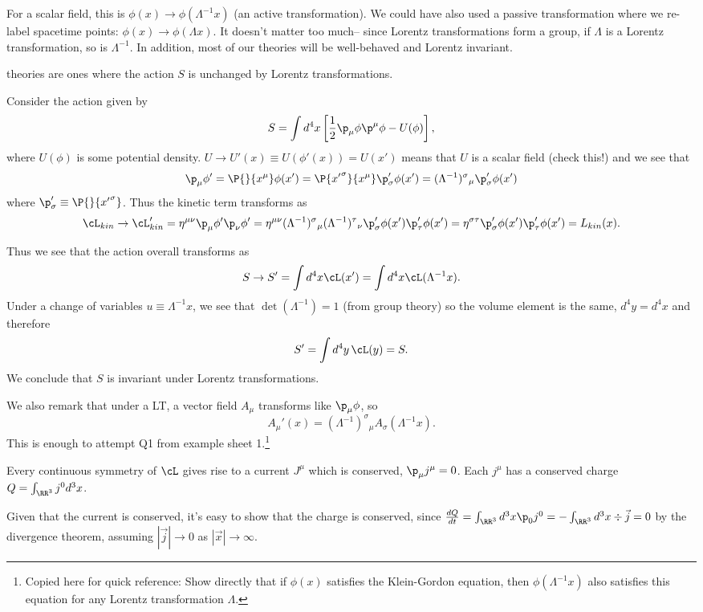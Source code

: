 For a scalar field, this is $\phi(x)\to \phi(\Lambda^{-1}x)$ (an active transformation). We could have also used a passive transformation where we re-label spacetime points: $\phi(x)\to \phi(\Lambda x)$. It doesn't matter too much-- since Lorentz transformations form a group, if $\Lambda$ is a Lorentz transformation, so is $\Lambda^{-1}$. In addition, most of our theories will be well-behaved and Lorentz invariant.

\begin{defn}
 theories are ones where the action $S$ is unchanged by Lorentz transformations.
\end{defn}

\begin{exm}
Consider the action given by
$$S=\int d^4x \left[\frac{1}{2} \p_\mu \phi \p^\mu \phi-U(\phi)\right],$$
where $U(\phi)$ is some potential density. $U\to U'(x) \equiv U(\phi'(x))= U(x')$ means that $U$ is a scalar field (check this!) and we see that
$$\p_\mu \phi' =\P{}{{x^\mu}}\phi(x')=\P{{{x'}^\sigma}}{{x^\mu}} \p_\sigma' \phi(x')= (\Lambda^{-1})^\sigma{}_\mu \p_\sigma' \phi(x')$$
where $\p_\sigma' \equiv \P{}{{{x'}^\sigma}}$.
Thus the kinetic term transforms as
$$\cL_{kin} \to \cL_{kin}'=\eta^{\mu\nu}\p_\mu \phi' \p_\nu \phi' =\eta^{\mu\nu}(\Lambda^{-1})^\sigma{}_\mu (\Lambda^{-1})^\tau{}_\nu \p_\sigma' \phi(x') \p_\tau' \phi(x')=\eta^{\sigma\tau} \p_\sigma' \phi(x')\p_\tau' \phi(x') = L_{kin}(x).$$

Thus we see that the action overall transforms as
$$S\to S' = \int d^4 x \cL(x')=\int d^4 x \cL(\Lambda^{-1}x).$$
Under a change of variables $u \equiv \Lambda^{-1} x$, we see that $\det(\Lambda^{-1})=1$ (from group theory) so the volume element is the same, $d^4y=d^4x$ and therefore
$$S'=\int d^4 y\, \cL(y)=S.$$
We conclude that $S$ is invariant under Lorentz transformations.
\end{exm}

We also remark that under a LT, a vector field $A_\mu$ transforms like $\p_\mu \phi$, so $$A_\mu'(x) = (\Lambda^{-1})^\sigma{}_\mu A_\sigma (\Lambda^{-1}x).$$
This is enough to attempt Q1 from example sheet 1.\footnote{Copied here for quick reference: Show directly that if $\phi(x)$ satisfies the Klein-Gordon equation, then $\phi(\Lambda^{-1} x)$ also satisfies this equation for any Lorentz transformation $\Lambda.$}

\begin{thm}
Every continuous symmetry of $\cL$ gives rise to a current $J^\mu$ which is conserved, $\p_\mu j^\mu=0$. Each $j^\mu$ has a conserved charge $Q=\int_{\RR^3} j^0 d^3x$.
\end{thm}
Given that the current is conserved, it's easy to show that the charge is conserved, since $\frac{dQ}{dt}=\int_{\RR^3} d^3x \p_0 j^0  = -\int_{\RR^3} d^3 x \div {\vec{j}} =0$ by the divergence theorem, assuming $|\vec{j}|\to 0$ as $|\vec{x}|\to \infty$.

